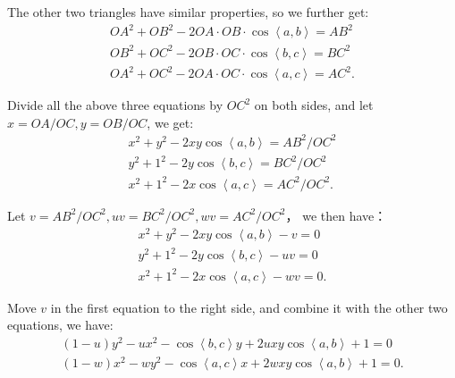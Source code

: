 The other two triangles have similar properties, so we further get:
\begin{equation}
\begin{array}{l}
O{A^2} + O{B^2} - 2OA \cdot OB \cdot \cos \left\langle a,b \right \rangle  = A{B^2}\\
O{B^2} + O{C^2} - 2OB \cdot OC \cdot \cos \left\langle b,c \right \rangle  = B{C^2}\\
O{A^2} + O{C^2} - 2OA \cdot OC \cdot \cos \left\langle a,c \right \rangle  = A{C^2}.
\end{array}
\end{equation}

Divide all the above three equations by $OC^2$ on both sides, and let $x=OA/OC, y=OB/OC$, we get:
\begin{equation}
\begin{array}{l}
{x^2} + {y^2} - 2xy\cos \left\langle a,b \right \rangle  = A{B^2}/O{C^2}\\
{y^2} + {1^2} - 2y\cos \left\langle b,c \right \rangle  = B{C^2}/O{C^2}\\
{x^2} + {1^2} - 2x\cos \left\langle a,c \right \rangle  = A{C^2}/O{C^2}.
\end{array}
\end{equation}

Let $v = AB^2/OC^2, uv = BC^2/OC^2, wv = AC^2/OC^2$， we then have：
\begin{equation}
\begin{array}{l}
{x^2} + {y^2} - 2xy\cos \left\langle a,b \right \rangle  - v = 0\\
{y^2} + {1^2} - 2y\cos \left\langle b,c \right \rangle  - uv = 0\\
{x^2} + {1^2} - 2x\cos \left\langle a,c \right \rangle  - wv = 0.
\end{array}
\end{equation}

Move $v$ in the first equation to the right side, and combine it with the other two equations, we have:
\begin{equation}
\begin{array}{l}
\left( {1 - u} \right){y^2} - u{x^2} - \cos \left\langle b,c \right \rangle y + 2uxy\cos \left\langle a,b \right \rangle  + 1 = 0 \\
\left( {1 - w} \right){x^2} - w{y^2} - \cos \left\langle a,c \right \rangle x + 2wxy\cos \left\langle a,b \right \rangle  + 1 = 0.
\end{array}
\end{equation}

